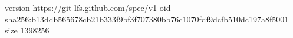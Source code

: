 version https://git-lfs.github.com/spec/v1
oid sha256:b13ddb565678cb21b333f9bf3f707380bb76c1070fdf9dcfb510dc197a8f5001
size 1398256
